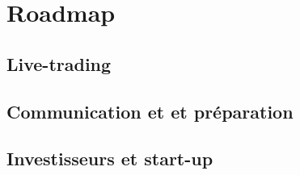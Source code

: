 \section{Roadmap}


\subsection{Live-trading}
\label{sub:Live-trading}

\subsection{Communication et et préparation}
\label{sub:Communication et et préparation}

\subsection{Investisseurs et start-up}
\label{sub:Investisseurs et start-up}


